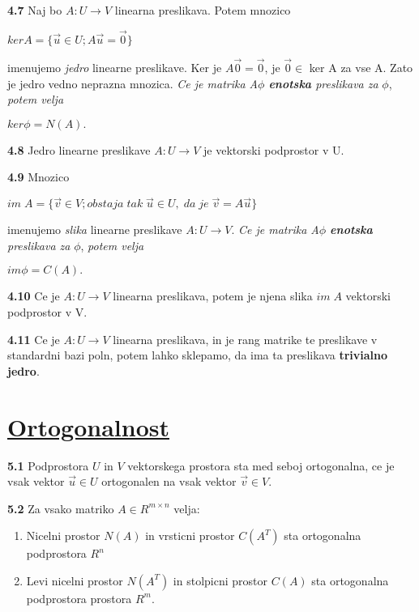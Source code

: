 \documentclass{article}
\begin{document}
\begin{multicols}{2}
	\textbf{4.7} Naj bo $A: U \rightarrow V$ linearna preslikava. Potem mnozico
	\begin{center}
		$ker A = \{ \vec{u} \in U; A\vec{u} = \vec{0}\}$
	\end{center}
	imenujemo \textit{jedro} linearne preslikave. Ker je $A\vec{0} = \vec{0}$, je $\vec{0} \in$ ker A za vse A.
	Zato je jedro vedno neprazna mnozica.
	\textit{Ce je matrika A$\phi$ \textbf{enotska} preslikava za } $\phi$, \textit{potem velja}
	\begin{center}
		\begin{math}
			ker \phi = N(A).
		\end{math}
	\end{center}

	\textbf{4.8} Jedro linearne preslikave $A: U \rightarrow V$ je vektorski podprostor v U.

	\textbf{4.9} Mnozico
	\begin{center}
		$im\; A = \{ \vec{v} \in V; obstaja\; tak\; \vec{u} \in U,\; da\; je\; \vec{v} = A\vec{u} \}$
	\end{center}
	imenujemo \textit{slika} linearne preslikave $A: U \rightarrow V$.
	\textit{Ce je matrika A$\phi$ \textbf{enotska} preslikava za } $\phi$, \textit{potem velja}
	\begin{center}
		\begin{math}
			im \phi = C(A).
		\end{math}
	\end{center}

	\textbf{4.10} Ce je $A: U \rightarrow V$ linearna preslikava, potem je njena slika $im\; A$
	vektorski podprostor v V.

	\textbf{4.11} Ce je $A: U \rightarrow V$ linearna preslikava, in je rang matrike te preslikave v standardni bazi poln,
	potem lahko sklepamo, da ima  ta preslikava \textbf{trivialno jedro}.


	\section{\underline{Ortogonalnost}}

	\textbf{5.1} Podprostora $U$ in $V$ vektorskega prostora sta med seboj ortogonalna,
	ce je vsak vektor $\vec{u} \in U$ ortogonalen na vsak vektor $\vec{v} \in V$.

	\textbf{5.2} Za vsako matriko $A \in R^{m \times n}$ velja:
	\begin{enumerate}
		\item Nicelni prostor $N(A)$ in vrsticni prostor $C(A^{T})$ sta ortogonalna podprostora $R^{n}$
		\item Levi nicelni prostor $N(A^{T})$ in stolpicni prostor $C(A)$ sta ortogonalna podprostora prostora $R^{m}$.
	\end{enumerate}


\end{multicols}
\end{document}
